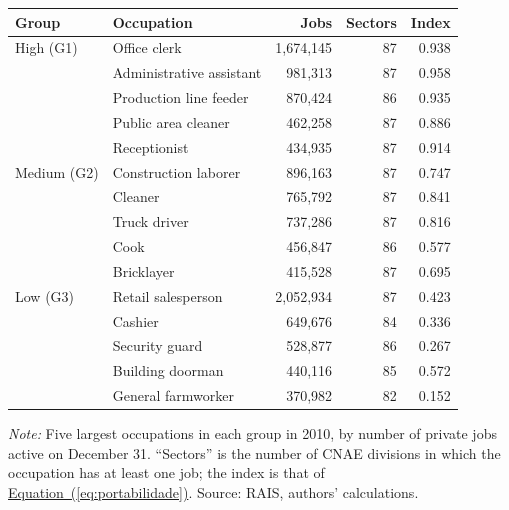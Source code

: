 {\small
\begin{threeparttable}
\begin{tabular}{llrrr}
\toprule
Group & Occupation & Jobs & Sectors & Index \\
\midrule
High (G1) & Office clerk & 1,674,145 & 87 & 0.938 \\
 & Administrative assistant & 981,313 & 87 & 0.958 \\
 & Production line feeder & 870,424 & 86 & 0.935 \\
 & Public area cleaner & 462,258 & 87 & 0.886 \\
 & Receptionist & 434,935 & 87 & 0.914 \\
\addlinespace[3pt]
Medium (G2) & Construction laborer & 896,163 & 87 & 0.747 \\
 & Cleaner & 765,792 & 87 & 0.841 \\
 & Truck driver & 737,286 & 87 & 0.816 \\
 & Cook & 456,847 & 86 & 0.577 \\
 & Bricklayer & 415,528 & 87 & 0.695 \\
\addlinespace[3pt]
Low (G3) & Retail salesperson & 2,052,934 & 87 & 0.423 \\
 & Cashier & 649,676 & 84 & 0.336 \\
 & Security guard & 528,877 & 86 & 0.267 \\
 & Building doorman & 440,116 & 85 & 0.572 \\
 & General farmworker & 370,982 & 82 & 0.152 \\
\bottomrule
\end{tabular}
\begin{tablenotes}[flushleft]\footnotesize
\item \textit{Note:} Five largest occupations in each group in 2010, by number of private jobs active on December 31. ``Sectors'' is the number of CNAE divisions in which the occupation has at least one job; the index is that of \hyperref[eq:portabilidade]{Equation~(\ref*{eq:portabilidade})}. Source: RAIS, authors' calculations.
\end{tablenotes}
\end{threeparttable}
}
